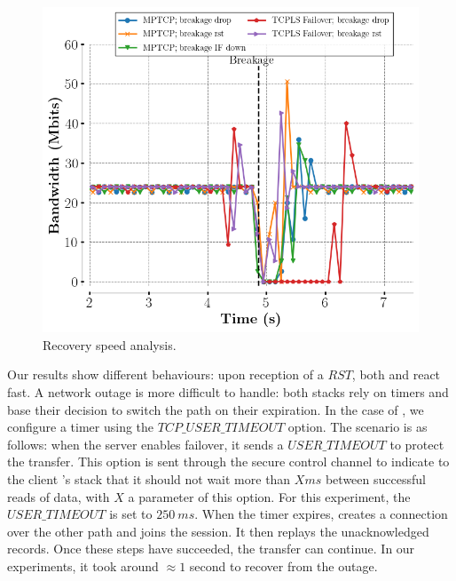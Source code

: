 \begin{figure}[!t]
  \begin{center}
    \includegraphics[width=\columnwidth]{figures/breakage_analysis.png}
  \end{center}
\vspace{-0.5cm}
  \caption{Recovery speed analysis.}
  \label{fig:recovery}
\end{figure}

Our results show different behaviours: upon reception of a $RST$, both
\tcpls and \mptcp react fast. A network outage
is more difficult to handle: both stacks rely on timers and base their
decision to switch the path on their expiration. In the case of \tcpls, we
configure a timer using the $TCP\_USER\_TIMEOUT$ \tcp option. The scenario is as
follows: when the server enables failover, it
sends a $USER\_TIMEOUT$ to protect the transfer. This option is sent through
the secure control channel to indicate to the client \tcpls's stack that it should
not wait more than $X ms$ between successful reads of data, with $X$ a
parameter of this option. For this experiment, the $USER\_TIMEOUT$ is set
to $250~ms$. When the timer expires, \tcpls creates a connection over the other path
and joins the session. It then replays the unacknowledged records. Once
these steps have succeeded, the transfer can continue. In our experiments, it took
around $\approx 1$ second to recover from the outage.


